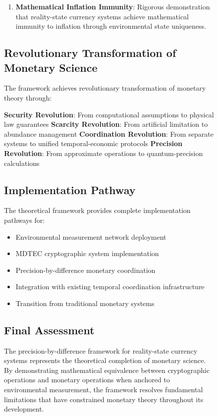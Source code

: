 \documentclass[12pt,a4paper]{article}
\begin{document}
\begin{figure}[H]
\begin{enumerate}
\item \textbf{Mathematical Inflation Immunity}: Rigorous demonstration that reality-state currency systems achieve mathematical immunity to inflation through environmental state uniqueness.
\end{enumerate}

\subsection{Revolutionary Transformation of Monetary Science}

The framework achieves revolutionary transformation of monetary theory through:

\textbf{Security Revolution}: From computational assumptions to physical law guarantees
\textbf{Scarcity Revolution}: From artificial limitation to abundance management  
\textbf{Coordination Revolution}: From separate systems to unified temporal-economic protocols
\textbf{Precision Revolution}: From approximate operations to quantum-precision calculations

\subsection{Implementation Pathway}

The theoretical framework provides complete implementation pathways for:
\begin{itemize}
\item Environmental measurement network deployment
\item MDTEC cryptographic system implementation
\item Precision-by-difference monetary coordination
\item Integration with existing temporal coordination infrastructure
\item Transition from traditional monetary systems
\end{itemize}

\subsection{Final Assessment}

The precision-by-difference framework for reality-state currency systems represents the theoretical completion of monetary science. By demonstrating mathematical equivalence between cryptographic operations and monetary operations when anchored to environmental measurement, the framework resolves fundamental limitations that have constrained monetary theory throughout its development.


\end{figure}
\end{document}
